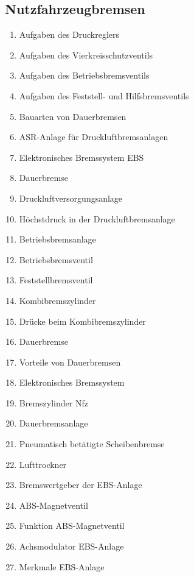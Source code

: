 \subsection{Nutzfahrzeugbremsen}\label{nutzfahrzeugbremsen}

\begin{enumerate}
\item
  Aufgaben des Druckreglers\\
\item
  Aufgaben des Vierkreisschutzventils\\
\item
  Aufgaben des Betriebsbremsventils\\
\item
  Aufgaben des Feststell- und Hilfsbremsventils\\
\item
  Bauarten von Dauerbremsen\\
\item
  ASR-Anlage für Druckluftbremsanlagen\\
\item
  Elektronisches Bremssystem EBS\\
\item
  Dauerbremse\\
\item
  Druckluftversorgungsanlage\\
\item
  Höchstdruck in der Druckluftbremsanlage\\
\item
  Betriebsbremsanlage\\
\item
  Betriebsbremsventil\\
\item
  Feststellbremsventil\\
\item
  Kombibremszylinder\\
\item
  Drücke beim Kombibremszylinder\\
\item
  Dauerbremse\\
\item
  Vorteile von Dauerbremsen\\
\item
  Elektronisches Bremssystem\\
\item
  Bremszylinder Nfz\\
\item
  Dauerbremsanlage\\
\item
  Pneumatisch betätigte Scheibenbremse\\
\item
  Lufttrockner\\
\item
  Bremswertgeber der EBS-Anlage\\
\item
  ABS-Magnetventil\\
\item
  Funktion ABS-Magnetventil\\
\item
  Achsmodulator EBS-Anlage\\
\item
  Merkmale EBS-Anlage
\end{enumerate}
